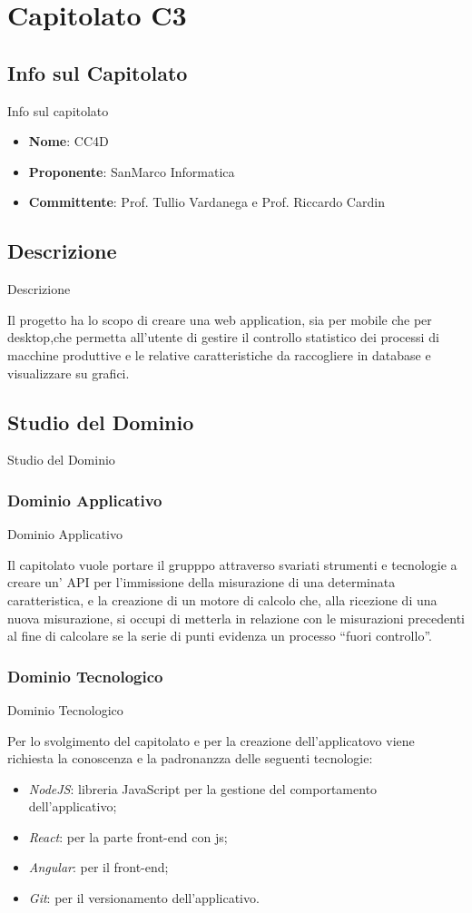 \documentclass[11pt]{article}
\begin{document}
\section{Capitolato C3}
    \subsection{Info sul Capitolato} Info sul capitolato
    \begin{itemize}
        \item \textbf{Nome}: CC4D
        \item \textbf{Proponente}: SanMarco Informatica
        \item \textbf{Committente}: Prof. Tullio Vardanega e Prof. Riccardo Cardin
    \end{itemize}
    \subsection{Descrizione} Descrizione
    
    Il progetto ha lo scopo di creare una web application, sia per mobile che per desktop,che
    permetta all’utente di gestire il controllo statistico dei processi di macchine produttive e 
    le relative caratteristiche da raccogliere in database e visualizzare su grafici.
    
    \subsection{Studio del Dominio} Studio del Dominio
        \subsubsection{Dominio Applicativo} Dominio Applicativo
        
        Il capitolato vuole portare il grupppo attraverso svariati strumenti e tecnologie a  creare un' API per l’immissione della misurazione di una determinata caratteristica, e la creazione di un motore di calcolo che, alla ricezione di una nuova misurazione, si occupi di metterla in relazione con le
        misurazioni precedenti al fine di calcolare se la serie di punti evidenza un processo “fuori controllo”.
        \subsubsection{Dominio Tecnologico} Dominio Tecnologico
        
        Per lo svolgimento del capitolato e per la creazione dell'applicatovo viene richiesta la conoscenza e la padronanzza delle seguenti tecnologie:
        \begin{itemize}
            \item \textit{NodeJS}: libreria JavaScript per la gestione del comportamento dell'applicativo;
            \item \textit{React}: per la parte front-end con js;
            \item \textit{Angular}: per il front-end;
            \item \textit{Git}: per il versionamento dell'applicativo.
        \end{itemize}
    
\end{document}
